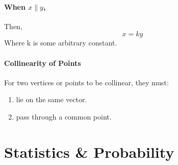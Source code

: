 \documentclass{report}
\begin{document}
\begin{flushleft}
\subsubsection{When $x \parallel y$,}
Then,
\begin{equation}
x=ky
\end{equation}
Where k is some arbitrary constant.

\subsubsection{Collinearity of Points}
For two vertices or points to be collinear, they must:
\begin{enumerate}
\item lie on the same vector.
\item pass through a common point.
\end{enumerate}


\chapter{Statistics \& Probability}


\end{flushleft}
\end{document}
